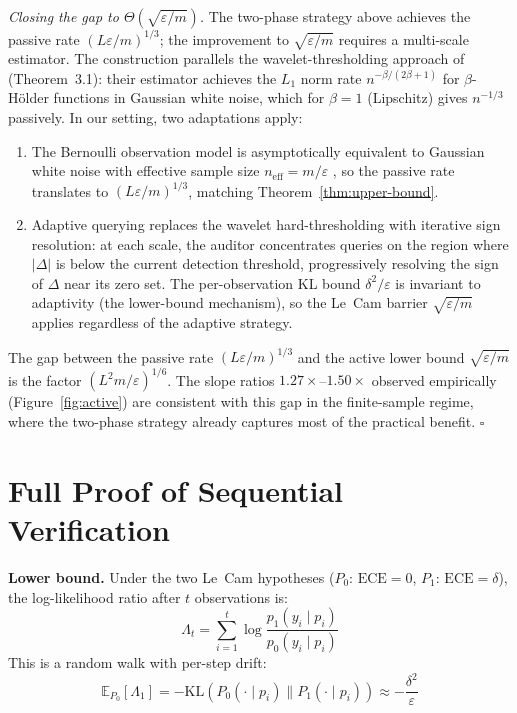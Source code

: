\documentclass{article}
\newcommand{\ECE}{\mathrm{ECE}}
\newcommand{\Lip}{L}
\newcommand{\errrate}{\varepsilon}
\newcommand{\nsamples}{m}
\newcommand{\calmap}{\Delta}
\providecommand{\E}{}
\renewcommand{\E}{\mathbb{E}}
\providecommand{\KL}{}
\renewcommand{\KL}{\mathrm{KL}}
\newcommand{\targetacc}{\delta}
\theoremstyle{definition}
\begin{document}
\emph{Closing the gap to $\Theta(\sqrt{\errrate/\nsamples})$.} The two-phase strategy above achieves the passive rate $(\Lip\errrate/\nsamples)^{1/3}$; the improvement to $\sqrt{\errrate/\nsamples}$ requires a multi-scale estimator. The construction parallels the wavelet-thresholding approach of \citet{lepski1999estimation} (Theorem~3.1): their estimator achieves the $L_1$ norm rate $n^{-\beta/(2\beta+1)}$ for $\beta$-H\"{o}lder functions in Gaussian white noise, which for $\beta = 1$ (Lipschitz) gives $n^{-1/3}$ passively. In our setting, two adaptations apply:
\begin{enumerate}
\item[(i)] The Bernoulli observation model is asymptotically equivalent to Gaussian white noise with effective sample size $n_{\mathrm{eff}} = \nsamples/\errrate$ \citep{brown1996equivalence}, so the passive rate translates to $(\Lip\errrate/\nsamples)^{1/3}$, matching Theorem~\ref{thm:upper-bound}.
\item[(ii)] Adaptive querying replaces the wavelet hard-thresholding with iterative sign resolution: at each scale, the auditor concentrates queries on the region where $|\calmap|$ is below the current detection threshold, progressively resolving the sign of $\calmap$ near its zero set. The per-observation KL bound $\delta^2/\errrate$ is invariant to adaptivity (the lower-bound mechanism), so the Le~Cam barrier $\sqrt{\errrate/\nsamples}$ applies regardless of the adaptive strategy.
\end{enumerate}

The gap between the passive rate $(\Lip\errrate/\nsamples)^{1/3}$ and the active lower bound $\sqrt{\errrate/\nsamples}$ is the factor $(\Lip^2\nsamples/\errrate)^{1/6}$. The slope ratios $1.27\times$--$1.50\times$ observed empirically (Figure~\ref{fig:active}) are consistent with this gap in the finite-sample regime, where the two-phase strategy already captures most of the practical benefit. $\square$

\section{Full Proof of Sequential Verification}
\label{app:sequential}

\textbf{Lower bound.} Under the two Le~Cam hypotheses ($P_0$: $\ECE = 0$, $P_1$: $\ECE = \targetacc$), the log-likelihood ratio after $t$ observations is:
\begin{equation}
\Lambda_t = \sum_{i=1}^{t} \log \frac{p_1(y_i \mid p_i)}{p_0(y_i \mid p_i)}
\end{equation}
This is a random walk with per-step drift:
\begin{equation}
\E_{P_0}[\Lambda_1] = -\KL(P_0(\cdot \mid p_i) \| P_1(\cdot \mid p_i)) \approx -\frac{\targetacc^2}{\errrate}
\end{equation}
\end{document}

